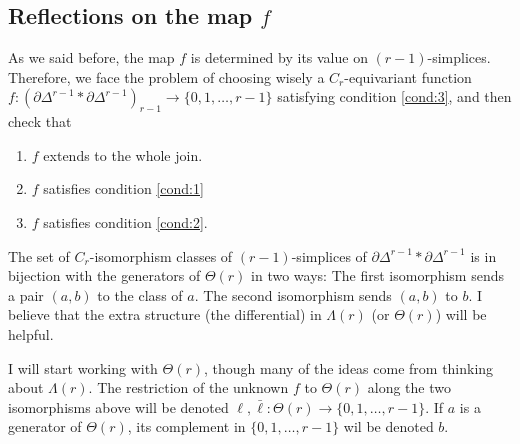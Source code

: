 	\subsection{Reflections on the map $f$} As we said before, the map $f$ is determined by its value on $(r-1)$-simplices. Therefore, we face the problem of choosing wisely a $C_r$-equivariant function $f\colon (\partial\Delta^{r-1}*\partial\Delta^{r-1})_{r-1}\to \{0,1,\ldots,r-1\}$ satisfying condition \eqref{cond:3}, and then check that
	\begin{enumerate}
		\item $f$ extends to the whole join.
		\item $f$ satisfies condition \eqref{cond:1}
		\item $f$ satisfies condition \eqref{cond:2}.
	\end{enumerate}
	The set of $C_r$-isomorphism classes of $(r-1)$-simplices of $\partial\Delta^{r-1}*\partial\Delta^{r-1}$ is in bijection with the generators of $\Theta(r)$ in two ways: The first isomorphism sends a pair $(a,b)$ to the class of $a$. The second isomorphism sends $(a,b)$ to $b$. I believe that the extra structure (the differential) in $\Lambda(r)$ (or $\Theta(r)$) will be helpful.

	I will start working with $\Theta(r)$, though many of the ideas come from thinking about $\Lambda(r)$. The restriction of the unknown $f$ to $\Theta(r)$ along the two isomorphisms above will be denoted $\ell,\bar{\ell}\colon \Theta(r)\to \{0,1,\ldots,r-1\}$. If $a$ is a generator of $\Theta(r)$, its complement in $\{0,1,\ldots,r-1\}$ wil be denoted $b$.


